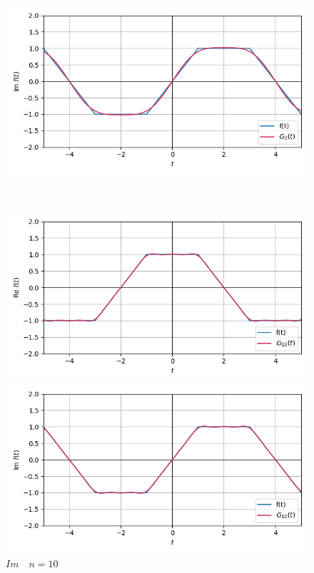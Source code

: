 \documentclass[a4paper]{article}
\begin{document}
\begin{figure}[H]
\begin{minipage}{0.5\textwidth}
        \caption{$Re\quad n = 3$}
    \end{minipage}\hfill
    \begin{minipage}{0.5\textwidth}
        \centering \includegraphics[width=\textwidth]{parametric_func/Im3.png}
        \caption{$Im\quad n = 3$}
    \end{minipage}\\[2em]
    \begin{minipage}{0.5\textwidth}
        \centering \includegraphics[width=\textwidth]{parametric_func/Re10.png}
        \caption{$Re\quad n = 10$}
    \end{minipage}\hfill
    \begin{minipage}{0.5\textwidth}
        \centering \includegraphics[width=\textwidth]{parametric_func/Im10.png}
        \caption{$Im\quad n = 10$}
    \end{minipage}
\end{figure}\noindent\
\end{document}
